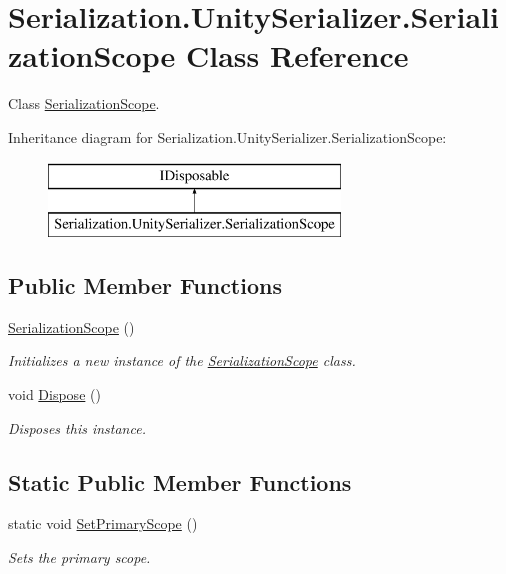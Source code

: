 \hypertarget{class_serialization_1_1_unity_serializer_1_1_serialization_scope}{}\section{Serialization.\+Unity\+Serializer.\+Serialization\+Scope Class Reference}
\label{class_serialization_1_1_unity_serializer_1_1_serialization_scope}


Class \hyperlink{class_serialization_1_1_unity_serializer_1_1_serialization_scope}{Serialization\+Scope}.  


Inheritance diagram for Serialization.\+Unity\+Serializer.\+Serialization\+Scope\+:\begin{figure}[H]
\begin{center}
\leavevmode
\includegraphics[height=2.000000cm]{class_serialization_1_1_unity_serializer_1_1_serialization_scope}
\end{center}
\end{figure}
\subsection*{Public Member Functions}
\begin{DoxyCompactItemize}
\item 
\hyperlink{class_serialization_1_1_unity_serializer_1_1_serialization_scope_a78abf81cfefbd73c5f45707fa4cc7635}{Serialization\+Scope} ()
\begin{DoxyCompactList}\small\item\em Initializes a new instance of the \hyperlink{class_serialization_1_1_unity_serializer_1_1_serialization_scope}{Serialization\+Scope} class. \end{DoxyCompactList}\item 
void \hyperlink{class_serialization_1_1_unity_serializer_1_1_serialization_scope_ac05852f2bd6c717194fff02bf062138e}{Dispose} ()
\begin{DoxyCompactList}\small\item\em Disposes this instance. \end{DoxyCompactList}\end{DoxyCompactItemize}
\subsection*{Static Public Member Functions}
\begin{DoxyCompactItemize}
\item 
static void \hyperlink{class_serialization_1_1_unity_serializer_1_1_serialization_scope_a20b9e60c200484505ab164f69491845d}{Set\+Primary\+Scope} ()
\begin{DoxyCompactList}\small\item\em Sets the primary scope. \end{DoxyCompactList}\end{DoxyCompactItemize}
